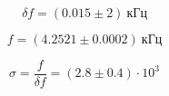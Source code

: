 \documentclass{article}
\begin{document}
\begin{equation*}
\end{equation*}

\begin{minipage}[t]{0.33\linewidth}
\centered
\begin{equation*}
\delta\textit{f} = (0.015 \pm 2) \: кГц
\end{equation*}
\end{minipage}
\begin{minipage}[t]{0.33\linewidth}
\centered
\begin{equation*}
\textit{f} = (4.2521 \pm 0.0002) \: кГц
\end{equation*}
\end{minipage}
\begin{minipage}[t]{0.33\linewidth}
\centered
\begin{equation*}
\sigma = \frac{\textit{f}}{\delta\textit{f}} = (2.8 \pm 0.4) \cdot 10^{3}
\end{equation*}
\end{minipage}
\begin{minipage}[h]{0.25\linewidth}
\centered
\begin{equation*}
\end{equation*}
\end{minipage}
\end{document}
